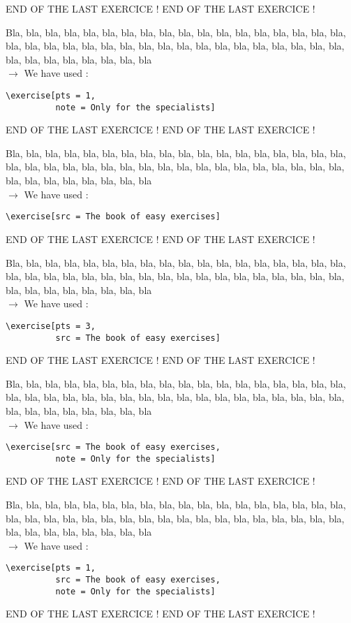 \documentclass[12pt]{article}
\newcommand\blabla{%
		\noindent Bla, bla, bla, bla, bla, bla, bla, bla, bla, bla, bla,
		bla, bla, bla, bla, bla, bla, bla, bla, bla, bla, bla,
		bla, bla, bla, bla, bla, bla, bla, bla, bla, bla, bla,
		bla, bla, bla, bla, bla, bla, bla, bla, bla, bla, bla
	}
\newcommand\codeused{
		\blabla{} \medskip  \\ \noindent $\rightarrow$ We have used :
	}
\begin{document}
\newpage \medskip \noindent END OF THE LAST EXERCICE ! END OF THE LAST EXERCICE !

\exercise[pts = 1, note = Only for the specialists]

\codeused{}
\begin{verbatim}
\exercise[pts = 1, 
          note = Only for the specialists]
\end{verbatim}



\newpage \medskip \noindent END OF THE LAST EXERCICE ! END OF THE LAST EXERCICE !

\exercise[src = The book of easy exercises]

\codeused{}
\begin{verbatim}
\exercise[src = The book of easy exercises]
\end{verbatim}



\newpage \medskip \noindent END OF THE LAST EXERCICE ! END OF THE LAST EXERCICE !

\exercise[pts = 3, src = The book of easy exercises]

\codeused{}
\begin{verbatim}
\exercise[pts = 3, 
          src = The book of easy exercises]
\end{verbatim}



\newpage \medskip \noindent END OF THE LAST EXERCICE ! END OF THE LAST EXERCICE !

\exercise[src = The book of easy exercises, note = Only for the specialists]

\codeused{}
\begin{verbatim}
\exercise[src = The book of easy exercises, 
          note = Only for the specialists]
\end{verbatim}



\newpage \medskip \noindent END OF THE LAST EXERCICE ! END OF THE LAST EXERCICE !

\exercise[pts = 1, src = The book of easy exercises, note = Only for the specialists]

\codeused{}
\begin{verbatim}
\exercise[pts = 1, 
          src = The book of easy exercises,
          note = Only for the specialists]
\end{verbatim}


\newpage \medskip \noindent END OF THE LAST EXERCICE ! END OF THE LAST EXERCICE !
\end{document}
